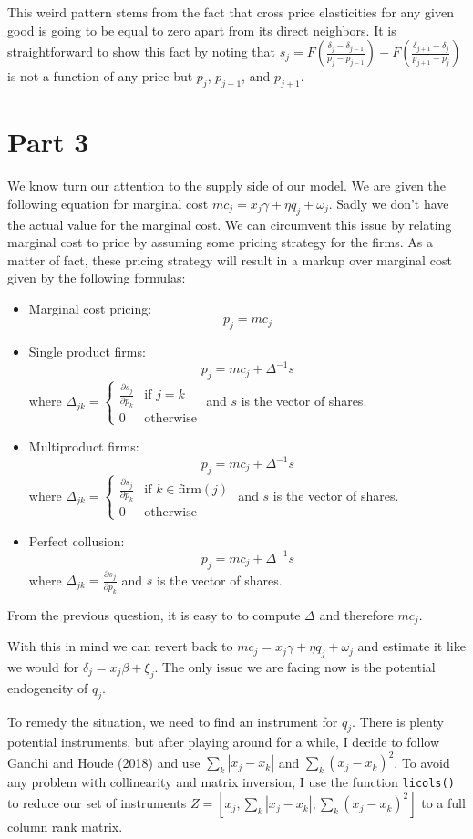 \documentclass[12pt]{article}
\newcommand{\1}{{\bf 1}} %
\newcommand{\inv}{^{-1}}
\newcommand{\mat}[1]{\begin{matrix}#1\end{matrix}}
\begin{document}
This weird pattern stems from the fact that cross price elasticities for any given good is going to be equal to zero apart from its direct neighbors. It is straightforward to show this fact by noting that $s_j= F\left({\frac{\delta_j-\delta_{j-1}}{p_j-p_{j-1}}}\right) - F\left( {\frac{\delta_{j+1}-\delta_{j}}{p_{j+1}-p_{j}}}\right)$ is not a function of any price but $p_j$, $p_{j-1}$, and $p_{j+1}$.

\section*{Part 3}

We know turn our attention to the supply side of our model. We are given the following equation for marginal cost $mc_j = x_j\gamma +\eta q_j +\omega_j$. Sadly we don't have the actual value for the marginal cost. We can circumvent this issue by relating marginal cost to price by assuming some pricing strategy for the firms. As a matter of fact, these pricing strategy will result in a markup over marginal cost given by the following formulas:
\begin{itemize}
	\item Marginal cost pricing:
	\[
p_j = mc_j
	\]
	\item Single product firms:
	\[
p_j = mc_j +\Delta\inv s
	\]
	where $\Delta_{jk} = \left\{\mat{\frac{\partial s_j}{\partial p_k} & \text{if }j=k\\ 0 & \text{otherwise}}\right.$ and $s$ is the vector of shares.

	\item Multiproduct firms:
	\[
p_j = mc_j +\Delta\inv s
	\]
	where $\Delta_{jk} = \left\{\mat{\frac{\partial s_j}{\partial p_k} & \text{if }k\in \text{firm}(j)\\ 0 & \text{otherwise}}\right.$ and $s$ is the vector of shares.

	\item Perfect collusion:
	\[
p_j = mc_j +\Delta\inv s
	\]
	where $\Delta_{jk} = \frac{\partial s_j}{\partial p_k} $ and $s$ is the vector of shares.
\end{itemize}

From the previous question, it is easy to to compute $\Delta$ and therefore $mc_j$.

With this in mind we can revert back to $mc_j = x_j\gamma +\eta q_j +\omega_j$ and estimate it like we would for $\delta_j = x_j\beta +\xi_j$. The only issue we are facing now is	the potential endogeneity of $q_j$.

To remedy the situation, we need to find an instrument for $q_j$. There is plenty potential instruments, but after playing around for a while, I decide to follow Gandhi and Houde (2018) and use $\sum_k |x_j-x_k|$ and $\sum_k (x_j - x_k)^2$. To avoid any problem with collinearity and matrix inversion, I use the function \verb!licols()! to reduce our set of instruments $Z = [x_j,\sum_k |x_j - x_k|, \sum_k (x_j - x_k)^2]$ to a full column rank matrix.
\end{document}
